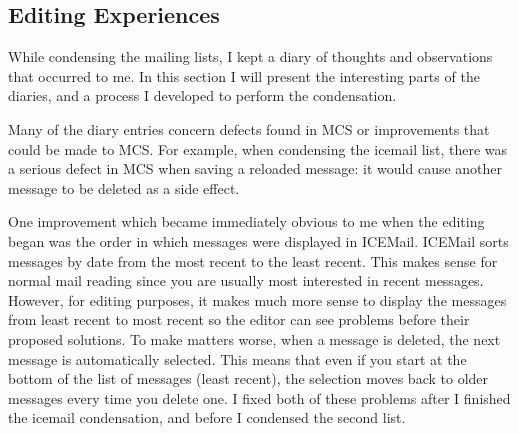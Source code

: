 
\subsection{Editing Experiences}
\label{sec:editing-experiences}
While condensing the mailing lists, I kept a diary of thoughts and observations
that occurred to me. In this section I will present the interesting parts of
the diaries, and a process I developed to perform the condensation.

Many of the diary entries concern defects found in MCS or improvements that
could be made to MCS. For example, when condensing the icemail list, there was
a serious defect in MCS when saving a reloaded message: it would cause another
message to be deleted as a side effect.

One improvement which became immediately obvious to me when the editing began
was the order in which messages were displayed in ICEMail. ICEMail sorts
messages by date from the most recent to the least recent. This makes sense for
normal mail reading since you are usually most interested in recent messages.
However, for editing purposes, it makes much more sense to display the messages
from least recent to most recent so the editor can see problems before their
proposed solutions. To make matters worse, when a message is deleted, the next
message is automatically selected. This means that even if you start at the
bottom of the list of messages (least recent), the selection moves back to
older messages every time you delete one. I fixed both of these problems after
I finished the icemail condensation, and before I condensed the second list.

